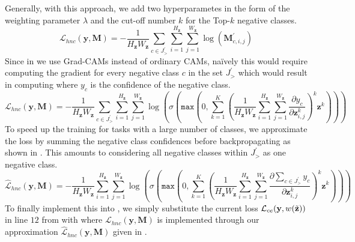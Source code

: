 Generally, with this approach, we add two hyperparametes in the form of the weighting parameter $\lambda$ and the cut-off number $k$ for the Top-$k$ negative classes.
\begin{equation}
\label{eq:hnc-kl-simple}
    \mathcal{L}_{hnc}(\mathbf{y}, \boldsymbol{M})= -\frac{1}{H_\mathbf{z} W_\mathbf{z}} \sum_{c \in J^{\prime}_>} \sum_{i=1}^{H_\mathbf{z}} \sum_{j=1}^{W_\mathbf{z}} \log \left(\boldsymbol{M}_{c, i, j}^{\prime}\right)
\end{equation}
Since in \divcam we use Grad-CAMs instead of ordinary CAMs, na\"{i}vely this would require computing the gradient for every negative class $c$ in the set $J^\prime_>$ which would result in computing  where $y_c$ is the confidence of the negative class. 
\begin{equation}
\label{eq:hnc-kl-grad-cam}
    \mathcal{L}_{hnc}(\mathbf{y}, \boldsymbol{M})= -\frac{1}{H_\mathbf{z} W_\mathbf{z}} \sum_{c \in J^{\prime}_>} \sum_{i=1}^{H_\mathbf{z}} \sum_{j=1}^{W_\mathbf{z}} \log \left( \sigma \left(\mathtt{max}\left(0,\sum_{k=1}^K\left(\frac{1}{H_\mathbf{z}W_\mathbf{z}} \sum_{i=1}^{H_\mathbf{z}} \sum_{j=1}^{W_\mathbf{z}} \frac{\partial y_c}{\partial \mathbf{z}_{i,j}^k}\right)^k \mathbf{z}^k\right)\right)\right)
\end{equation}
To speed up the training for tasks with a large number of classes, we approximate the loss by summing the negative class confidences before backpropagating as shown in . This amounts to considering all negative classes within $J^\prime_>$ as one negative class. 
\begin{equation}
\label{eq:hnc-kl-grad-cam-approx}
    \widehat{\mathcal{L}}_{hnc}(\mathbf{y}, \boldsymbol{M})= -\frac{1}{H_\mathbf{z} W_\mathbf{z}} \sum_{i=1}^{H_\mathbf{z}} \sum_{j=1}^{W_\mathbf{z}} \log \left( \sigma \left(\mathtt{max}\left(0,\sum_{k=1}^K\left(\frac{1}{H_\mathbf{z}W_\mathbf{z}} \sum_{i=1}^{H_\mathbf{z}} \sum_{j=1}^{W_\mathbf{z}} \frac{\partial \sum_{c \in J^{\prime}_>} y_c}{\partial \mathbf{z}_{i,j}^k}\right)^k \mathbf{z}^k\right)\right)\right)
\end{equation}
To finally implement this into \divcam, we simply substitute the current loss $\mathcal{L}_{ce}(\mathbf{y}, w(\Tilde{\mathbf{z}}))$ in line $12$ from  with  where $\mathcal{L}_{hnc}(\mathbf{y}, \boldsymbol{M})$ is implemented through our approximation $\widehat{\mathcal{L}}_{hnc}(\mathbf{y}, \boldsymbol{M})$ given in . 

